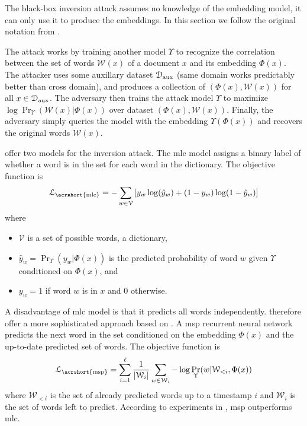 			The black-box inversion attack assumes no knowledge of the embedding model, it can only use it to produce the embeddings.
			In this section we follow the original notation from \cite{embedding-attacks}.

			The attack works by training another model $\Upsilon$ to recognize the correlation between the set of words $\mathcal{W}(x)$ of a document $x$ and its embedding $\Phi(x)$.
			The attacker uses some auxillary dataset $\mathcal{D}_\text{aux}$ (same domain works predictably better than cross domain), and produces a collection of $ ( \Phi(x), \mathcal{W}(x) ) $ for all $x \in \mathcal{D}_\text{aux}$.
			The adversary then trains the attack model $\Upsilon$ to maximize $ \log \Pr_\Upsilon ( \mathcal{W}(x) | \Phi(x) ) $ over dataset $ ( \Phi(x), \mathcal{W}(x) ) $.
			Finally, the adversary simply queries the model with the embedding $ \Upsilon( \Phi( x ) ) $ and recovers the original words $\mathcal{W}(x)$.

			\textcite{embedding-attacks} offer two models for the inversion attack.
			The \acrfull{mlc} model assigns a binary label of whether a word is in the set for each word in the dictionary.
			The objective function is
			\[
				\mathcal{L}_{\text{\acrshort{mlc}}} = -\sum_{ w \in \mathcal{V} } \left[ y_w \log( \hat{y}_w ) + (1 - y_w) \log(1 - \hat{y}_w) \right]
			\]
			where
			\begin{itemize}
				\item $\mathcal{V}$ is a set of possible words, a dictionary,
				\item $\hat{y}_w = \Pr_\Upsilon( y_w | \Phi( x ) )$ is the predicted probability of word $w$ given $\Upsilon$ conditioned on $\Phi( x )$, and
				\item $y_w = 1$ if word $w$ is in $x$ and 0 otherwise.
			\end{itemize}

			A disadvantage of \acrshort{mlc} model is that it predicts all words independently.
			\textcite{embedding-attacks} therefore offer a more sophisticated approach based on \cite{msp}.
			A \acrfull{msp} recurrent neural network predicts the next word in the set conditioned on the embedding $\Phi( x )$ and the up-to-date predicted set of words.
			The objective function is
			\[
				\mathcal{L}_{\text{\acrshort{msp}}} = \sum_{ i = 1 }^\ell \frac{1}{| \mathcal{W}_i |} \sum_{w \in \mathcal{W}_i } - \log \Pr_\Upsilon( w | \mathcal{W}_{ < i }, \Phi( x ) )
			\]
			where $\mathcal{W}_{ < i }$ is the set of already predicted words up to a timestamp $i$ and $\mathcal{W}_i$ is the set of words left to predict.
			According to experiments in \cite{embedding-attacks}, \acrshort{msp} outperforms \acrshort{mlc}.

